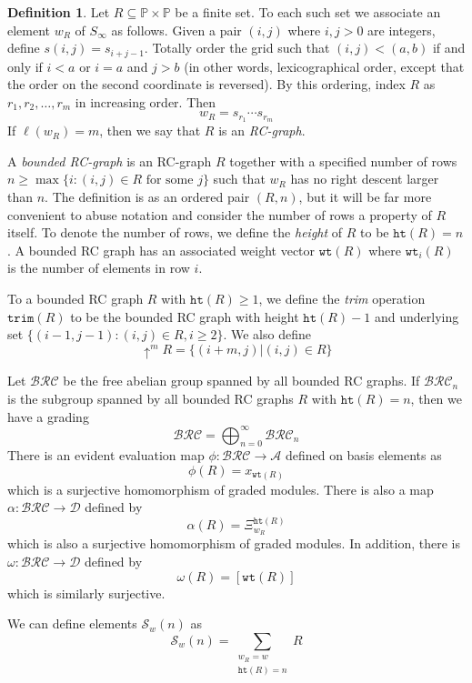 \documentclass{amsart}
\theoremstyle{definition}
\newtheorem{definition}[lemma]{Definition}
\theoremstyle{remark}
\numberwithin{equation}{subsection}
\newcommand{\shup}{{\uparrow}}
\newcommand{\wof}[1]{w_{#1}}
\newcommand{\wtt}{\mathtt{wt}}
\newcommand{\trm}{\mathtt{trim}}
\newcommand{\hr}{\mathtt{ht}}
\newcommand{\BRC}{\mathcal{BRC}}
\newcommand{\dsch}{\ensuremath{\Xi}}
\newcommand{\coma}{\mathcal{A}}
\newcommand{\dcoma}{\mathcal{D}}
\begin{document}
\begin{definition}\label{definition:rcgraph}
	Let $R\subseteq \mathbb{P}\times \mathbb{P}$ be a finite set. To each such set we associate an element $\wof{R}$ of $S_\infty$ as follows. Given a pair $(i, j)$ where $i,j>0$ are integers, define $s(i,j) = s_{i+j - 1}$. Totally order the grid such that $(i, j) < (a, b)$ if and only if $i < a$ or $i = a$ and $j > b$ (in other words, lexicographical order, except that the order on the second coordinate is reversed). By this ordering, index $R$ as $r_1, r_2,\ldots, r_m$ in increasing order. Then
	$$\wof{R} = s_{r_1}\cdots s_{r_m}$$
	If $\ell(\wof{R}) = m$, then we say that $R$ is an \emph{RC-graph}.
	
	A \emph{bounded RC-graph} is an RC-graph $R$ together with a specified number of rows $n\geq \max\{i: (i,j)\in R\text{ for some }j\}$ such that $\wof{R}$ has no right descent larger than $n$. The definition is as an ordered pair $(R, n)$, but it will be far more convenient to abuse notation and consider the number of rows a property of $R$ itself. To denote the number of rows, we define the \emph{height} of $R$ to be $\hr(R)=n$. A bounded RC graph has an associated weight vector $\wtt(R)$ where $\wtt_i(R)$ is the number of elements in row $i$.
	
	To a bounded RC graph $R$ with $\hr(R)\geq 1$, we define the \emph{trim} operation $\trm(R)$ to be the bounded RC graph with height $\hr(R)-1$ and underlying set $\{(i-1, j-1): (i,j)\in R, i\geq 2\}$. We also define
	$$\shup^m R=\{(i+m, j)| (i,j)\in R\}$$
\end{definition}



Let $\BRC$ be the free abelian group spanned by all bounded RC graphs. If $\BRC_n$ is the subgroup spanned by all bounded RC graphs $R$ with $\hr(R)=n$, then we have a grading
$$\BRC = \bigoplus_{n=0}^\infty \BRC_n$$
There is an evident evaluation map $\phi: \BRC\to \coma$ defined on basis elements as
$$\phi(R) = x_{\wtt(R)}$$
which is a surjective homomorphism of graded modules. There is also a map $\alpha:\BRC\to\dcoma$ defined by
$$\alpha(R) = \dsch_{\wof{R}}^{\hr(R)}$$
which is also a surjective homomorphism of graded modules. In addition, there is $\omega:\BRC\to \dcoma$ defined by
$$\omega(R) = [\wtt(R)]$$
which is similarly surjective.

We can define elements $\mathcal{S}_w(n)$ as
$$\mathcal{S}_w(n) = \sum_{\substack{\wof{R}=w\\\hr(R)=n}}R$$
\end{document}
